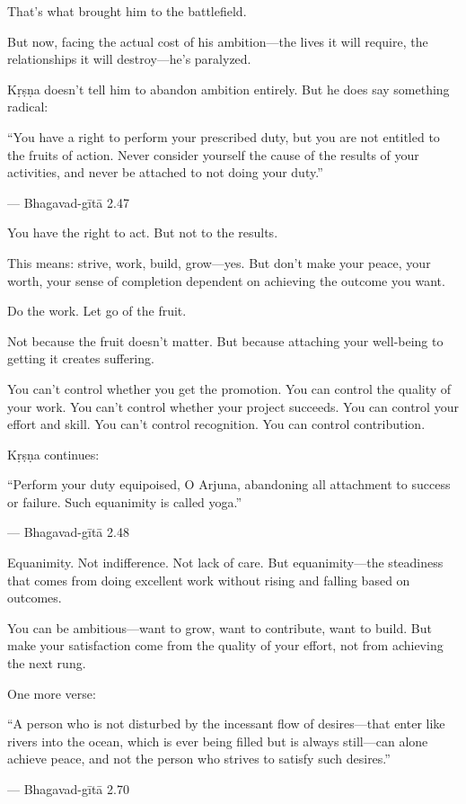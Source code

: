 \documentclass[11pt,twoside]{book}
\begin{document}
That's what brought him to the battlefield.

But now, facing the actual cost of his ambition—the lives it will require, the relationships it will destroy—he's paralyzed.

Kṛṣṇa doesn't tell him to abandon ambition entirely. But he does say something radical:

\begin{pullquote}
``You have a right to perform your prescribed duty, but you are not entitled to the fruits of action. Never consider yourself the cause of the results of your activities, and never be attached to not doing your duty.''

--- Bhagavad-gītā 2.47
\end{pullquote}

You have the right to act. But not to the results.

This means: strive, work, build, grow—yes. But don't make your peace, your worth, your sense of completion dependent on achieving the outcome you want.

Do the work. Let go of the fruit.

Not because the fruit doesn't matter. But because attaching your well-being to getting it creates suffering.

You can't control whether you get the promotion. You can control the quality of your work. You can't control whether your project succeeds. You can control your effort and skill. You can't control recognition. You can control contribution.

Kṛṣṇa continues:

\begin{pullquote}
``Perform your duty equipoised, O Arjuna, abandoning all attachment to success or failure. Such equanimity is called yoga.''

--- Bhagavad-gītā 2.48
\end{pullquote}

Equanimity. Not indifference. Not lack of care. But equanimity—the steadiness that comes from doing excellent work without rising and falling based on outcomes.

You can be ambitious—want to grow, want to contribute, want to build. But make your satisfaction come from the quality of your effort, not from achieving the next rung.

One more verse:

\begin{pullquote}
``A person who is not disturbed by the incessant flow of desires—that enter like rivers into the ocean, which is ever being filled but is always still—can alone achieve peace, and not the person who strives to satisfy such desires.''

--- Bhagavad-gītā 2.70
\end{pullquote}
\end{document}
